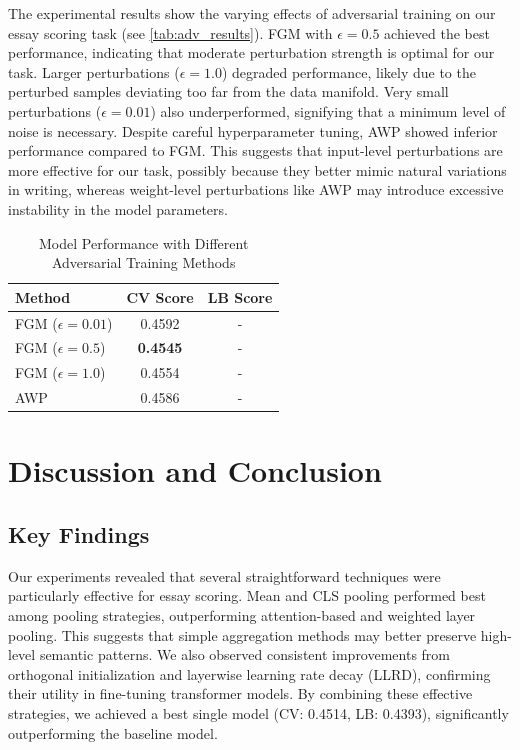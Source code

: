 \documentclass[12pt]{article}
\begin{document}
 The experimental results show the varying effects of adversarial training on our essay scoring task (see \autoref{tab:adv_results}). FGM with $\epsilon=0.5$ achieved the best performance, indicating that moderate perturbation strength is optimal for our task. Larger perturbations ($\epsilon=1.0$) degraded performance, likely due to the perturbed samples deviating too far from the data manifold. Very small perturbations ($\epsilon=0.01$) also underperformed, signifying that a minimum level of noise is necessary. Despite careful hyperparameter tuning, AWP showed inferior performance compared to FGM. This suggests that input-level perturbations are more effective for our task, possibly because they better mimic natural variations in writing, whereas weight-level perturbations like AWP may introduce excessive instability in the model parameters.

\begin{table}[H]
\centering
\caption{Model Performance with Different Adversarial Training Methods}
\label{tab:adv_results}
\begin{tabular}{lcc}
\hline
\textbf{Method} & \textbf{CV Score} & \textbf{LB Score} \\
\hline
FGM ($\epsilon=0.01$) & 0.4592 & - \\
FGM ($\epsilon=0.5$) & \textbf{0.4545} & - \\
FGM ($\epsilon=1.0$) & 0.4554 & - \\
AWP & 0.4586 & - \\
\hline
\end{tabular}
\end{table}


\section{Discussion and Conclusion}

\subsection{Key Findings}

Our experiments revealed that several straightforward techniques were particularly effective for essay scoring. Mean and CLS pooling performed best among pooling strategies, outperforming attention-based and weighted layer pooling. This suggests that simple aggregation methods may better preserve high-level semantic patterns. We also observed consistent improvements from orthogonal initialization and layerwise learning rate decay (LLRD), confirming their utility in fine-tuning transformer models. By combining these effective strategies, we achieved a best single model (CV: 0.4514, LB: 0.4393), significantly outperforming the baseline model.
\end{document}
